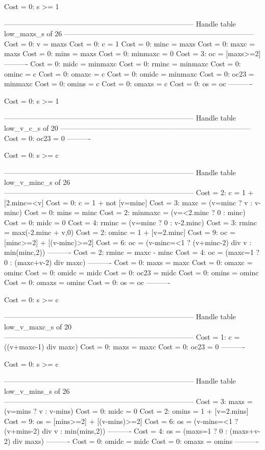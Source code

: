 Cost =  0:  s >= 1

--------------------------------------------------------------------------------
Handle table low_maxs_s of 26
--------------------------------------------------------------------------------
Cost =  0:  v       = maxs
Cost =  0:  c       = 1
Cost =  0:  minc    = maxs
Cost =  0:  maxc    = maxs
Cost =  0:  mins    = maxs
Cost =  0:  minmaxc = 0
Cost =  3:  oc      = [maxs>=2]
----------
Cost =  0:  midc    = minmaxc
Cost =  0:  rminc   = minmaxc
Cost =  0:  ominc   = c
Cost =  0:  omaxc   = c
Cost =  0:  omidc   = minmaxc
Cost =  0:  oc23    = minmaxc
Cost =  0:  omins   = c
Cost =  0:  omaxs   = c
Cost =  0:  os      = oc
----------

Cost =  0:  s >= 1

--------------------------------------------------------------------------------
Handle table low_v_c_s of 20
--------------------------------------------------------------------------------
Cost =  0:  oc23 = 0
----------

Cost =  0:  s >= c

--------------------------------------------------------------------------------
Handle table low_v_minc_s of 26
--------------------------------------------------------------------------------
Cost =  2:  c       = 1 + [2.minc=<v]
Cost =  0:  c       = 1 + not [v=minc]
Cost =  3:  maxc    = (v=minc ? v : v-minc)
Cost =  0:  mins    = minc
Cost =  2:  minmaxc = (v=<2.minc ? 0 : minc)
Cost =  0:  midc    = 0
Cost =  4:  rminc   = (v=minc ? 0 : v-2.minc)
Cost =  3:  rminc   = max(-2.minc + v,0)
Cost =  2:  ominc   = 1 + [v=2.minc]
Cost =  9:  oc      = [minc>=2] + [(v-minc)>=2]
Cost =  6:  oc      = (v-minc=<1 ? (v+minc-2) div v : min(minc,2))
----------
Cost =  2:  rminc   = maxc - minc
Cost =  4:  oc      = (maxc=1 ? 0 : (maxc+v-2) div maxc)
----------
Cost =  0:  maxs    = maxc
Cost =  0:  omaxc   = ominc
Cost =  0:  omidc   = midc
Cost =  0:  oc23    = midc
Cost =  0:  omins   = ominc
Cost =  0:  omaxs   = ominc
Cost =  0:  os      = oc
----------

Cost =  0:  s >= c

--------------------------------------------------------------------------------
Handle table low_v_maxc_s of 20
--------------------------------------------------------------------------------
Cost =  1:  c    = ((v+maxc-1) div maxc)
Cost =  0:  maxs = maxc
Cost =  0:  oc23 = 0
----------

Cost =  0:  s >= c

--------------------------------------------------------------------------------
Handle table low_v_mins_s of 26
--------------------------------------------------------------------------------
Cost =  3:  maxs  = (v=mins ? v : v-mins)
Cost =  0:  midc  = 0
Cost =  2:  omins = 1 + [v=2.mins]
Cost =  9:  os    = [mins>=2] + [(v-mins)>=2]
Cost =  6:  os    = (v-mins=<1 ? (v+mins-2) div v : min(mins,2))
----------
Cost =  4:  os    = (maxs=1 ? 0 : (maxs+v-2) div maxs)
----------
Cost =  0:  omidc = midc
Cost =  0:  omaxs = omins
----------

